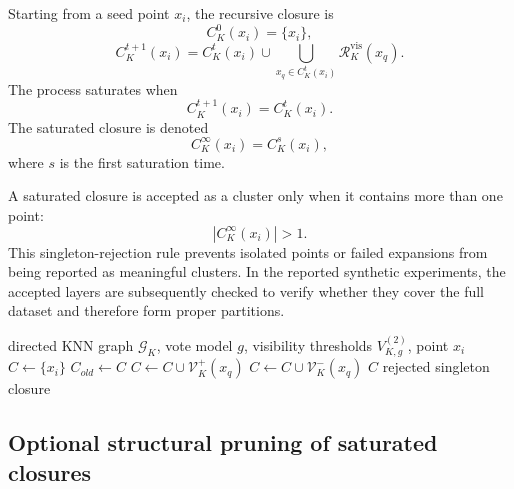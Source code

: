 \documentclass[pdflatex,sn-mathphys-num]{sn-jnl}
\newcommand{\calG}{\mathcal{G}}
\newcommand{\calR}{\mathcal{R}}
\newcommand{\calV}{\mathcal{V}}
\begin{document}
Starting from a seed point $x_i$, the recursive closure is
\begin{equation}
C_K^0(x_i)=\{x_i\},
\end{equation}
\begin{equation}
C_K^{t+1}(x_i)=C_K^t(x_i)\cup
\bigcup_{x_q\in C_K^t(x_i)}\calR_K^{\mathrm{vis}}(x_q).
\label{eq:visibility_closure}
\end{equation}
The process saturates when
\begin{equation}
C_K^{t+1}(x_i)=C_K^t(x_i).
\end{equation}
The saturated closure is denoted
\begin{equation}
C_K^\infty(x_i)=C_K^s(x_i),
\end{equation}
where $s$ is the first saturation time.

A saturated closure is accepted as a cluster only when it contains more than one point:
\begin{equation}
|C_K^\infty(x_i)|>1.
\label{eq:singleton_rejection}
\end{equation}
This singleton-rejection rule prevents isolated points or failed expansions from being reported as meaningful clusters. In the reported synthetic experiments, the accepted layers are subsequently checked to verify whether they cover the full dataset and therefore form proper partitions.

\begin{algorithm}[t]
\caption{Visibility-filtered round-trip closure for one point}
\label{alg:visibility_closure}
\begin{algorithmic}[1]
\Require directed KNN graph $\calG_K$, vote model $g$, visibility thresholds $V_{K,g}^{(2)}$, point $x_i$
\State $C \gets \{x_i\}$
\Repeat
    \State $C_{old}\gets C$
        \State $C\gets C\cup\calV_K^+(x_q)$
        \State $C\gets C\cup\calV_K^-(x_q)$
    \EndFor
{}
    \State \Return $C$
\Else
    \State \Return rejected singleton closure
\EndIf
\end{algorithmic}
\end{algorithm}

\subsection{Optional structural pruning of saturated closures}
\label{sec:structural_pruning}
\end{document}
